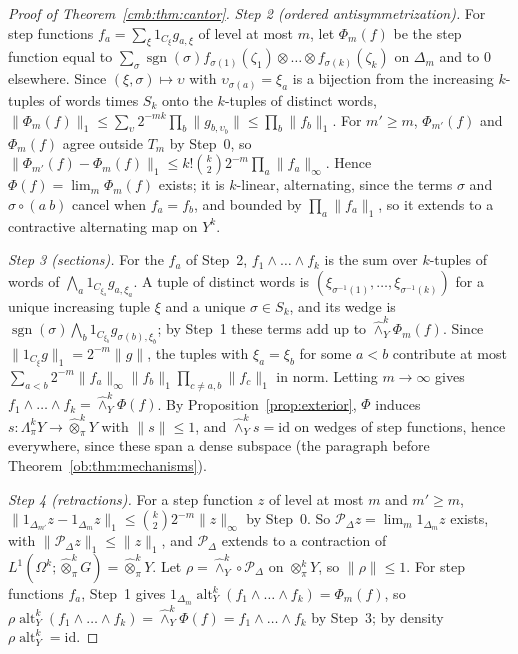 \documentclass[11pt]{amsart}
\theoremstyle{definition}
\theoremstyle{remark}
\numberwithin{equation}{section}
\newcommand{\sgn}{\operatorname{sgn}}
\newcommand{\id}{\mathrm{id}}
\newcommand{\norm}[1]{\lVert #1\rVert}
\theoremstyle{plain}
\theoremstyle{definition}
\theoremstyle{plain}
\newcommand{\alt}{\operatorname{alt}}
\newcommand{\cP}{\mathcal P}
\begin{document}
\begin{proof}[Proof of Theorem~\ref{cmb:thm:cantor}]
\emph{Step 2 (ordered antisymmetrization).} For step functions $f_a=\sum_\xi1_{C_\xi}g_{a,\xi}$ of level at most $m$,
let $\Phi_m(f)$ be the step function equal to $\sum_\sigma\sgn(\sigma)f_{\sigma(1)}(\zeta_1)\otimes\dots\otimes
f_{\sigma(k)}(\zeta_k)$ on $\Delta_m$ and to $0$ elsewhere. Since $(\xi,\sigma)\mapsto\upsilon$ with
$\upsilon_{\sigma(a)}=\xi_a$ is a bijection from the increasing $k$-tuples of words times $S_k$ onto the $k$-tuples of
distinct words, $\norm{\Phi_m(f)}_1\le\sum_\upsilon2^{-mk}\prod_b\norm{g_{b,\upsilon_b}}\le\prod_b\norm{f_b}_1$. For
$m'\ge m$, $\Phi_{m'}(f)$ and $\Phi_m(f)$ agree outside $T_m$ by Step~0, so
$\norm{\Phi_{m'}(f)-\Phi_m(f)}_1\le k!\binom k22^{-m}\prod_a\norm{f_a}_\infty$. Hence $\Phi(f)=\lim_m\Phi_m(f)$ exists; it
is $k$-linear, alternating, since the terms $\sigma$ and $\sigma\circ(a\ b)$ cancel when $f_a=f_b$, and bounded by
$\prod_a\norm{f_a}_1$, so it extends to a contractive alternating map on $Y^k$.

\emph{Step 3 (sections).} For the $f_a$ of Step~2, $f_1\wedge\dots\wedge f_k$ is the sum over $k$-tuples of words of
$\bigwedge_a1_{C_{\xi_a}}g_{a,\xi_a}$. A tuple of distinct words is $(\xi_{\sigma^{-1}(1)},\dots,\xi_{\sigma^{-1}(k)})$
for a unique increasing tuple $\xi$ and a unique $\sigma\in S_k$, and its wedge is
$\sgn(\sigma)\bigwedge_b1_{C_{\xi_b}}g_{\sigma(b),\xi_b}$; by Step~1 these terms add up to $\widehat\wedge^k_Y\Phi_m(f)$.
Since $\norm{1_{C_\xi}g}_1=2^{-m}\norm g$, the tuples with $\xi_a=\xi_b$ for some $a<b$ contribute at most
$\sum_{a<b}2^{-m}\norm{f_a}_\infty\norm{f_b}_1\prod_{c\ne a,b}\norm{f_c}_1$ in norm. Letting $m\to\infty$ gives
$f_1\wedge\dots\wedge f_k=\widehat\wedge^k_Y\Phi(f)$. By Proposition~\ref{prop:exterior}, $\Phi$ induces
$s\colon\Lambda^k_\pi Y\to\widehat\otimes^k_\pi Y$ with $\norm s\le1$, and $\widehat\wedge^k_Ys=\id$ on wedges of step
functions, hence everywhere, since these span a dense subspace (the paragraph before Theorem~\ref{ob:thm:mechanisms}).

\emph{Step 4 (retractions).} For a step function $z$ of level at most $m$ and $m'\ge m$,
$\norm{1_{\Delta_{m'}}z-1_{\Delta_m}z}_1\le\binom k22^{-m}\norm z_\infty$ by Step~0. So $\cP_\Delta z=\lim_m1_{\Delta_m}z$
exists, with $\norm{\cP_\Delta z}_1\le\norm z_1$, and $\cP_\Delta$ extends to a contraction of
$L^1(\Omega^k;\widehat\otimes^k_\pi G)=\widehat\otimes^k_\pi Y$. Let $\rho=\widehat\wedge^k_Y\circ\cP_\Delta$ on
$\otimes^k_\pi Y$, so $\norm\rho\le1$. For step functions $f_a$, Step~1 gives
$1_{\Delta_m}\alt^k_Y(f_1\wedge\dots\wedge f_k)=\Phi_m(f)$, so
$\rho\alt^k_Y(f_1\wedge\dots\wedge f_k)=\widehat\wedge^k_Y\Phi(f)=f_1\wedge\dots\wedge f_k$ by Step~3; by density
$\rho\alt^k_Y=\id$.


\end{proof}
\end{document}
